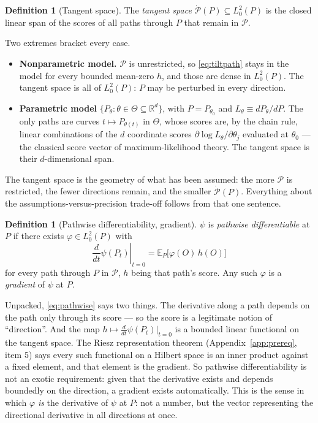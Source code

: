 \documentclass[11pt,a4paper]{article}
\theoremstyle{plain}
\theoremstyle{definition}
\newtheorem{definition}[theorem]{Definition}
\theoremstyle{remark}
\newcommand{\E}{\mathbb E}
\begin{document}
\begin{definition}[Tangent space]\label{def:tangent}
The \emph{tangent space} $\dot{\mathcal P}(P)\subseteq L^2_0(P)$ is the closed linear span of the
scores of all paths through $P$ that remain in $\mathcal P$.
\end{definition}

Two extremes bracket every case.

\begin{itemize}[leftmargin=*]
\item \textbf{Nonparametric model.} $\mathcal P$ is unrestricted, so \eqref{eq:tiltpath} stays in
the model for every bounded mean-zero $h$, and those are dense in $L^2_0(P)$. The tangent space
is all of $L^2_0(P)$: $P$ may be perturbed in every direction.
\item \textbf{Parametric model} $\{P_\theta:\theta\in\Theta\subseteq\mathbb R^d\}$, with
$P=P_{\theta_0}$ and $L_\theta\equiv dP_\theta/dP$. The only paths are
curves $t\mapsto P_{\theta(t)}$ in $\Theta$, whose scores are, by the chain rule, linear
combinations of the $d$ coordinate scores $\partial\log L_\theta/\partial\theta_j$ evaluated at
$\theta_0$ --- the classical score vector of maximum-likelihood theory. The tangent space is
their $d$-dimensional span.
\end{itemize}

The tangent space is the geometry of what has been assumed: the more $\mathcal P$ is restricted,
the fewer directions remain, and the smaller $\dot{\mathcal P}(P)$. Everything about the
assumptions-versus-precision trade-off follows from that one sentence.

\begin{definition}[Pathwise differentiability, gradient]\label{def:pathwise}
$\psi$ is \emph{pathwise differentiable} at $P$ if there exists $\varphi\in L^2_0(P)$ with
\begin{equation}
\left.\frac{d}{dt}\psi(P_t)\right|_{t=0}=\E_P\bigl[\varphi(O)\,h(O)\bigr]
\label{eq:pathwise}
\end{equation}
for every path through $P$ in $\mathcal P$, $h$ being that path's score. Any such $\varphi$ is a
\emph{gradient} of $\psi$ at $P$.
\end{definition}

Unpacked, \eqref{eq:pathwise} says two things. The derivative along a path depends on the path
only through its score --- so the score is a legitimate notion of ``direction''. And the map
$h\mapsto\frac{d}{dt}\psi(P_t)|_{t=0}$ is a bounded linear functional on the tangent space. The
Riesz representation theorem (Appendix~\ref{app:prereq}, item 5) says every such functional on a
Hilbert space is an inner product against a fixed element, and that element is the gradient. So
pathwise differentiability is not an exotic requirement: given that the derivative exists and
depends boundedly on the direction, a gradient exists automatically. This is the sense in which
$\varphi$
\emph{is} the derivative of $\psi$ at $P$: not a number, but the vector representing the
directional derivative in all directions at once.
\end{document}
